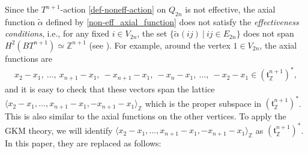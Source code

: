 \documentclass[12pt]{amsart}
\theoremstyle{remark}
\numberwithin{equation}{section}
\newcommand{\algt}{\mathfrak{t}}
\begin{document}
Since the $T^{n+1}$-action \eqref{def-noneff-action} on $Q_{2n}$ is not effective,
the axial function $\widetilde{\alpha}$ defined by  
\eqref{non-eff_axial_function} 
does not satisfy the {\it effectiveness conditions}, i.e., 
for any fixed $i\in V_{2n}$, the set $\{\widetilde{\alpha}(ij)\ |\ ij\in E_{2n}\}$ does not span $H^{2}(BT^{n+1})\simeq \mathbb{Z}^{n+1}$ 
 (see \cite[Section 2.1]{Ku19}).
For example, around the vertex $1\in V_{2n}$, the axial functions are
\begin{align}
\label{non-primitive-vectors}
x_{2}-x_{1},\ \ldots,\ x_{n+1}-x_{1},\ -x_{n+1}-x_{1},\ -x_{n}-x_{1},\ \ldots,\ -x_{2}-x_{1}\in (\mathfrak{t}_{\mathbb{Z}}^{n+1})^{*},
\end{align}
and it is easy to check that 
these vectors span the lattice $\langle x_{2}-x_{1},\ldots, x_{n+1}-x_{1}, -x_{n+1}-x_{1}\rangle_{\mathbb{Z}}$ which is the proper subspace in $(\mathfrak{t}_{\mathbb{Z}}^{n+1})^{*}$. 
This is also similar to the axial functions on the other vertices. 
To apply the GKM theory, we will identify 
$\langle x_{2}-x_{1},\ldots, x_{n+1}-x_{1}, -x_{n+1}-x_{1}\rangle_{\mathbb{Z}}$ as 
$(\algt^{n+1}_{\mathbb{Z}})^{*}$.
In this paper, they are replaced as follows:
\end{document}
